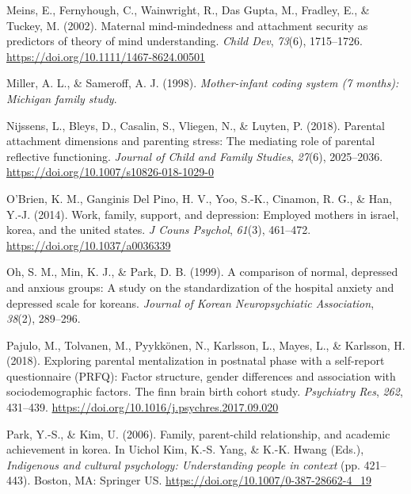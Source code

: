 \documentclass[
]{article}
\newlength{\cslhangindent}
\newlength{\cslentryspacingunit} %
\newenvironment{CSLReferences}[2] %
 {%
  \setlength{\parindent}{0pt}
  \ifodd #1
  \let\oldpar\par
  \def\par{\hangindent=\cslhangindent\oldpar}
  \fi
  \setlength{\parskip}{#2\cslentryspacingunit}
 }%
 {}
\begin{document}
\begin{CSLReferences}{1}{0}
\leavevmode{}%
Meins, E., Fernyhough, C., Wainwright, R., Das Gupta, M., Fradley, E., \& Tuckey, M. (2002). Maternal mind-mindedness and attachment security as predictors of theory of mind understanding. \emph{Child Dev}, \emph{73}(6), 1715--1726. \url{https://doi.org/10.1111/1467-8624.00501}

\leavevmode{}%
Miller, A. L., \& Sameroff, A. J. (1998). \emph{Mother-infant coding system (7 months): Michigan family study}.

\leavevmode{}%
Nijssens, L., Bleys, D., Casalin, S., Vliegen, N., \& Luyten, P. (2018). Parental attachment dimensions and parenting stress: The mediating role of parental reflective functioning. \emph{Journal of Child and Family Studies}, \emph{27}(6), 2025--2036. \url{https://doi.org/10.1007/s10826-018-1029-0}

\leavevmode{}%
O'Brien, K. M., Ganginis Del Pino, H. V., Yoo, S.-K., Cinamon, R. G., \& Han, Y.-J. (2014). Work, family, support, and depression: Employed mothers in israel, korea, and the united states. \emph{J Couns Psychol}, \emph{61}(3), 461--472. \url{https://doi.org/10.1037/a0036339}

\leavevmode{}%
Oh, S. M., Min, K. J., \& Park, D. B. (1999). A comparison of normal, depressed and anxious groups: A study on the standardization of the hospital anxiety and depressed scale for koreans. \emph{Journal of Korean Neuropsychiatic Association}, \emph{38}(2), 289--296.

\leavevmode{}%
Pajulo, M., Tolvanen, M., Pyykkönen, N., Karlsson, L., Mayes, L., \& Karlsson, H. (2018). Exploring parental mentalization in postnatal phase with a self-report questionnaire (PRFQ): Factor structure, gender differences and association with sociodemographic factors. The finn brain birth cohort study. \emph{Psychiatry Res}, \emph{262}, 431--439. \url{https://doi.org/10.1016/j.psychres.2017.09.020}

\leavevmode{}%
Park, Y.-S., \& Kim, U. (2006). Family, parent-child relationship, and academic achievement in korea. In Uichol Kim, K.-S. Yang, \& K.-K. Hwang (Eds.), \emph{Indigenous and cultural psychology: Understanding people in context} (pp. 421--443). Boston, MA: Springer US. \url{https://doi.org/10.1007/0-387-28662-4_19}


\end{CSLReferences}
\end{document}

